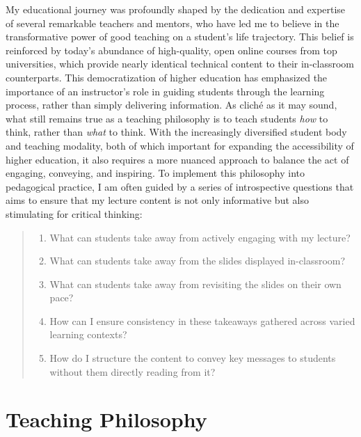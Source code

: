 My educational journey was profoundly shaped by the dedication and expertise of several remarkable teachers and mentors, who have led me to believe in the transformative power of good teaching on a student's life trajectory. This belief is reinforced by today's abundance of high-quality, open online courses from top universities, which provide nearly identical technical content to their in-classroom counterparts. This democratization of higher education has emphasized the importance of an instructor's role in guiding students through the learning process, rather than simply delivering information. As cliché as it may sound, what still remains true as a teaching philosophy is to teach students \emph{how} to think, rather than \emph{what} to think. With the increasingly diversified student body and teaching modality, both of which important for expanding the accessibility of higher education, it also requires a more nuanced approach to balance the act of engaging, conveying, and inspiring. To implement this philosophy into pedagogical practice, I am often guided by a series of introspective questions that aims to ensure that my lecture content is not only informative but also stimulating for critical thinking:
\begin{quote}
    \begin{enumerate}[nosep,leftmargin=*]
        \item What can students take away from actively engaging with my lecture?
        \item What can students take away from the slides displayed in-classroom?
        \item What can students take away from revisiting the slides on their own pace?
        \item How can I ensure consistency in these takeaways gathered across varied learning contexts?
        \item How do I structure the content to convey key messages to students without them directly reading from it?
    \end{enumerate}
\end{quote}

\section*{Teaching Philosophy}

